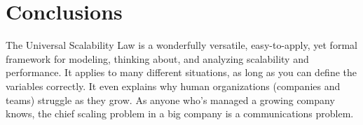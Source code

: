 \documentclass{vivid_layout}
\begin{document}
% 
% 

\section{Conclusions}

The Universal Scalability Law is a wonderfully versatile, easy-to-apply, yet
formal framework for modeling, thinking about, and analyzing scalability and
performance. It applies to many different situations, as long as you can define
the variables correctly. It even explains why human organizations (companies and
teams) struggle as they grow. As anyone who's managed a growing company knows,
the chief scaling problem in a big company is a communications problem.
\end{document}
